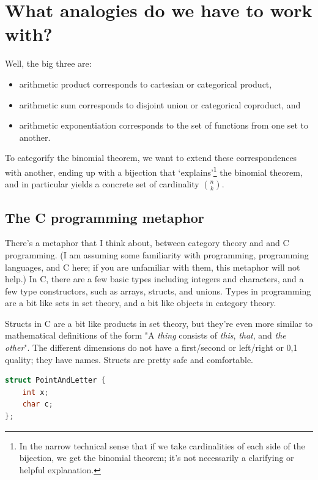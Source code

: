 \documentclass{proc-l}
\theoremstyle{definition}
\theoremstyle{remark}
\numberwithin{equation}{section}
\begin{document}
\section{What analogies do we have to work with?}

Well, the big three are:
\begin{itemize}
    \item arithmetic product corresponds to cartesian or categorical product,
    \item arithmetic sum corresponds to disjoint union or categorical coproduct, and
    \item arithmetic exponentiation corresponds to the set of functions from one set to another.
\end{itemize}

To categorify the binomial theorem, we want to extend these correspondences with another, ending up with a bijection that `explains'\footnote{In the narrow technical sense that if we take cardinalities of each side of the bijection, we get the
binomial theorem; it's not necessarily a clarifying or helpful explanation.} the binomial theorem, and in particular yields a concrete set of cardinality \({n \choose k}\).

\subsection{The C programming metaphor}

There's a metaphor that I think about, between category theory and and C programming.
(I am assuming some familiarity with programming, programming languages, and C here;
if you are unfamiliar with them, this metaphor will not help.)
In C, there are a few basic types including integers and characters, and a few type constructors, such as arrays,
structs, and unions. Types in programming are a bit like sets in set theory, and a bit like objects in category theory.

Structs in C are a bit like products in set theory, but they're even more similar to mathematical definitions of the form "A \emph{thing} consists of \emph{this}, \emph{that}, and \emph{the other}". The different dimensions do not have a first/second or left/right or 0,1 quality; they have names. Structs are pretty safe and comfortable. 

\begin{lstlisting}[language=C]
struct PointAndLetter {
    int x;
    char c;
};
\end{lstlisting}
\end{document}
